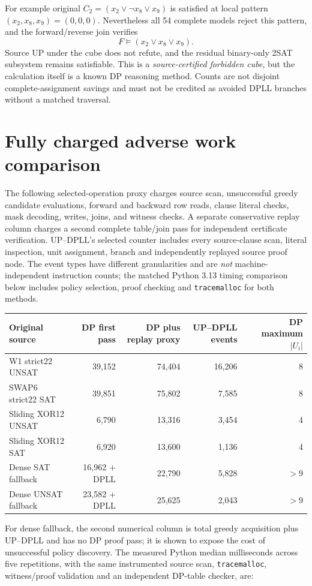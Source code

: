 \documentclass[10pt]{article}
\begin{document}
For example original $C_2=(x_2\vee\neg x_8\vee x_9)$ is satisfied at local pattern $(x_2,x_8,x_9)=(0,0,0)$. Nevertheless all 54 complete models reject this pattern, and the forward/reverse join verifies
\[
 F\models (x_2\vee x_8\vee x_9).
\]
Source UP under the cube does not refute, and the residual binary-only 2SAT subsystem remains satisfiable. This is a \emph{source-certified forbidden cube}, but the calculation itself is a known DP reasoning method. Counts are not disjoint complete-assignment savings and must not be credited as avoided DPLL branches without a matched traversal.

\section{Fully charged adverse work comparison}
The following selected-operation proxy charges source scan, unsuccessful greedy candidate evaluations, forward and backward row reads, clause literal checks, mask decoding, writes, joins, and witness checks. A separate conservative replay column charges a second complete table/join pass for independent certificate verification. UP--DPLL's selected counter includes every source-clause scan, literal inspection, unit assignment, branch and independently replayed source proof node. The event types have different granularities and are \emph{not} machine-independent instruction counts; the matched Python 3.13 timing comparison below includes policy selection, proof checking and \texttt{tracemalloc} for both methods.
\begin{center}\small
\begin{tabular}{lrrrr}
\toprule Original source & DP first pass & DP plus replay proxy & UP--DPLL events & DP maximum $|U_i|$\\\midrule
W1 strict22 UNSAT &39,152&74,404&16,206&8\\
SWAP6 strict22 SAT &39,851&75,802&7,585&8\\
Sliding XOR12 UNSAT &6,790&13,316&3,454&4\\
Sliding XOR12 SAT &6,920&13,600&1,136&4\\
Dense SAT fallback &16,962 + DPLL&22,790&5,828&$>9$\\
Dense UNSAT fallback &23,582 + DPLL&25,625&2,043&$>9$\\\bottomrule
\end{tabular}
\end{center}
For dense fallback, the second numerical column is total greedy acquisition plus UP--DPLL and has no DP proof pass; it is shown to expose the cost of unsuccessful policy discovery. The measured Python median milliseconds across five repetitions, with the same instrumented source scan, \texttt{tracemalloc}, witness/proof validation and an independent DP-table checker, are:
\end{document}
